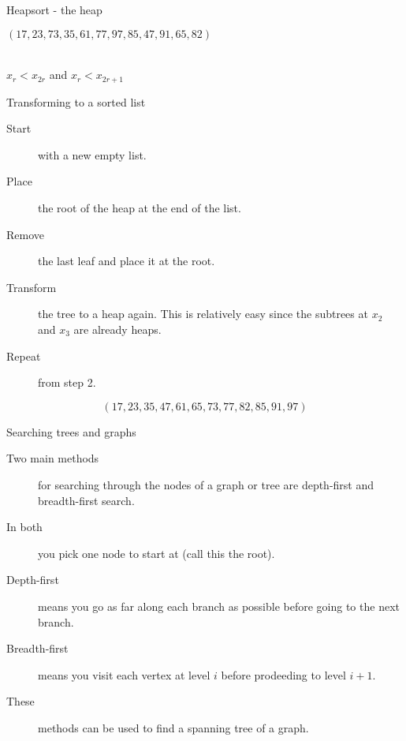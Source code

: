 \begin{frame}[fragile]{Heapsort - the heap}
  \begin{center}
    $(17,23,73,35,61,77,97,85,47,91,65,82)$ \\[2mm]
     \\[2mm]
    $x_r < x_{2r}$ and $x_r < x_{2r+1}$
  \end{center}
\end{frame}


\begin{frame}{Transforming to a sorted list}
  \begin{description}
    \item[Start] with a new empty list.
    \item[Place] the root of the heap at the end of the list.
    \item[Remove] the last leaf and place it at the root.
    \item[Transform] the tree to a heap again. This is relatively easy since the subtrees at $x_2$ and $x_3$ are already heaps.
    \item[Repeat] from step 2.
  \end{description}
  \vspace{4mm}
  $$ (17,23,35,47,61,65,73,77,82,85,91,97) $$
\end{frame}


\begin{frame}{Searching trees and graphs}
  \begin{description}
    \item[Two main methods] for searching through the nodes of a graph or tree are depth-first and breadth-first search.
    \item[In both] you pick one node to start at (call this the root).
    \item[Depth-first] means you go as far along each branch as possible before going to the next branch.
    \item[Breadth-first] means you visit each vertex at level $i$ before prodeeding to level $i+1$.
    \item[These] methods can be used to find a spanning tree of a graph.
  \end{description}
\end{frame}


